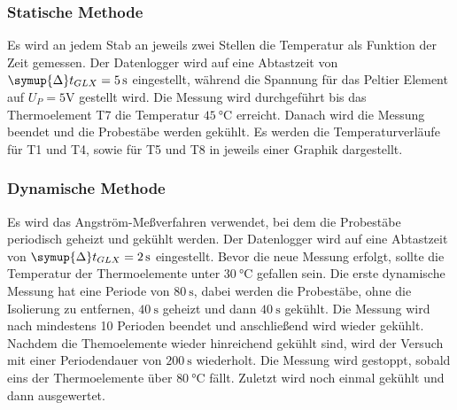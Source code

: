 \subsubsection{Statische Methode}
Es wird an jedem Stab an jeweils zwei Stellen die Temperatur als Funktion der Zeit gemessen. 
Der Datenlogger wird auf eine Abtastzeit von $\symup{\Delta} t_{GLX}=\SI{5}{\second}$ eingestellt, während die Spannung für das Peltier Element auf $U_P=5\si{\volt}$ gestellt wird.
Die Messung wird durchgeführt bis das Thermoelement T7 die Temperatur $\SI{45}{\celsius}$ erreicht. Danach wird die Messung beendet und die Probestäbe werden gekühlt.
Es werden die Temperaturverläufe für T1 und T4, sowie für T5 und T8 in jeweils einer Graphik dargestellt.
\subsubsection{Dynamische Methode}
Es wird das Angström-Meßverfahren verwendet, bei dem die Probestäbe periodisch geheizt und gekühlt werden.
Der Datenlogger wird auf eine Abtastzeit von $\symup{\Delta}t_{GLX}=\SI{2}{\second}$ eingestellt.
Bevor die neue Messung erfolgt, sollte die Temperatur der Thermoelemente unter $\SI{30}{\celsius}$ gefallen sein.
Die erste dynamische Messung hat eine Periode von $\SI{80}{\second}$, dabei werden die Probestäbe, ohne die Isolierung zu entfernen, $\SI{40}{\second}$ geheizt und dann $\SI{40}{\second}$ gekühlt.
Die Messung wird nach mindestens 10 Perioden beendet und anschließend wird wieder gekühlt.
Nachdem die Themoelemente wieder hinreichend gekühlt sind, wird der Versuch mit einer Periodendauer von $\SI{200}{\second}$ wiederholt.
Die Messung wird gestoppt, sobald eins der Thermoelemente über $\SI{80}{\celsius}$ fällt.
Zuletzt wird noch einmal gekühlt und dann ausgewertet.